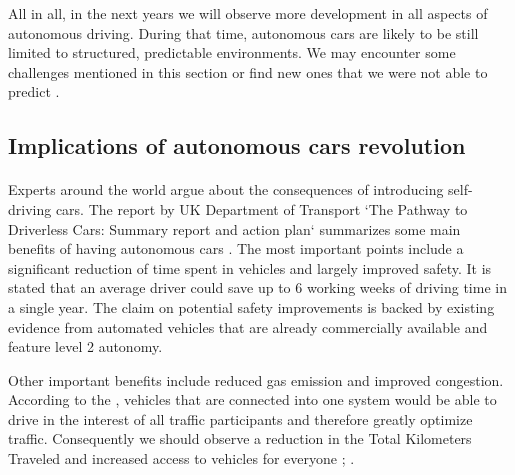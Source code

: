\documentclass[11pt,english]{article}
\begin{document}
\par
All in all, in the next years we will observe more development in all aspects of autonomous driving. 
During that time, autonomous cars are likely to be still limited to structured, predictable environments.
We may encounter some challenges mentioned in this section or find new ones that we were not able to predict \citep{luettel2012autonomous}.












\subsection{Implications of autonomous cars revolution}



\paragraph{}
Experts around the world argue about the consequences of introducing self-driving cars. The report by UK Department of Transport `The Pathway to Driverless Cars: Summary report and action plan` summarizes some main benefits of having autonomous cars \citep{pathwaytodriverless}. The most important points include a significant reduction of time spent in vehicles and largely improved safety. It is stated that an average driver could save up to 6 working weeks of driving time in a single year. The claim on potential safety improvements is backed by existing evidence from automated vehicles that are already commercially available and feature level 2 autonomy. 
\par
Other important benefits include reduced gas emission and improved congestion. According to the \citet{pathwaytodriverless}, vehicles that are connected into one system would be able to drive in the interest of all traffic participants and therefore greatly optimize traffic. Consequently we should observe a reduction in the Total Kilometers Traveled and increased access to vehicles for everyone \citep{pathwaytodriverless} ; \citep{drivewave}.
\par
\end{document}
